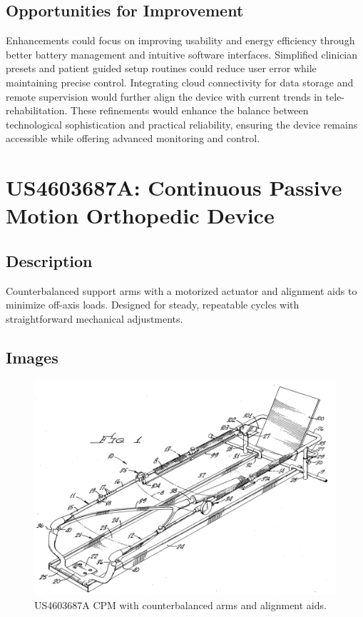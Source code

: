 \documentclass[11pt]{article}
\begin{document}
\subsection{Opportunities for Improvement}
Enhancements could focus on improving usability and energy efficiency through better battery management and intuitive software interfaces. Simplified clinician presets and patient guided setup routines could reduce user error while maintaining precise control. Integrating cloud connectivity for data storage and remote supervision would further align the device with current trends in tele-rehabilitation. These refinements would enhance the balance between technological sophistication and practical reliability, ensuring the device remains accessible while offering advanced monitoring and control.

\section{US4603687A: Continuous Passive Motion Orthopedic Device}
\subsection{Description}
Counterbalanced support arms with a motorized actuator and alignment aids to minimize off-axis loads. Designed for steady, repeatable cycles with straightforward mechanical adjustments.
\subsection{Images}
\begin{figure}[H]
  \centering
  \includegraphics[width=0.54\linewidth]{US4603687_1.png}
  \caption{US4603687A CPM with counterbalanced arms and alignment aids.}
  \label{fig:US4603687A}
\end{figure}
\end{document}
